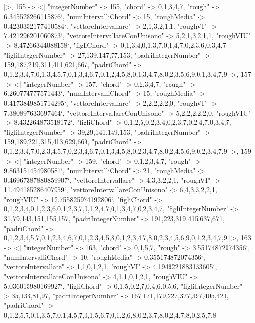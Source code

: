 \documentclass[
]{article}
\begin{document}
\begin{DatasetVerbatim}
  |>,
  155 -> <|
    "integerNumber" -> 155,
    "chord" -> {0,1,3,4,7},
    "rough" -> 6.345528266115876`,
    "numIntervalliChord" -> 15,
    "roughMedia" -> 0.4230352177410584`,
    "vettoreIntervallare" -> {2,1,3,2,1,1},
    "roughVI" -> 7.421296201060873`,
    "vettoreIntervallareConUnisono" -> {5,2,1,3,2,1,1},
    "roughVIU" -> 8.47266344088158`,
    "figliChord" -> {{0,1,3,4},{0,1,3,7},{0,1,4,7},{0,2,3,6},{0,3,4,7}},
    "figliIntegerNumber" -> {27,139,147,77,153},
    "padriIntegerNumber" -> {159,187,219,311,411,621,667},
    "padriChord" -> {{0,1,2,3,4,7},{0,1,3,4,5,7},{0,1,3,4,6,7},{0,1,2,4,5,8},{0,1,3,4,7,8},{0,2,3,5,6,9},{0,1,3,4,7,9}}
  |>,
  157 -> <|
    "integerNumber" -> 157,
    "chord" -> {0,2,3,4,7},
    "rough" -> 6.260774777571443`,
    "numIntervalliChord" -> 15,
    "roughMedia" -> 0.4173849851714295`,
    "vettoreIntervallare" -> {2,2,2,2,2,0},
    "roughVI" -> 7.380897633697464`,
    "vettoreIntervallareConUnisono" -> {5,2,2,2,2,2,0},
    "roughVIU" -> 8.432264873518172`,
    "figliChord" -> {{0,1,2,5},{0,2,3,4},{0,2,3,7},{0,2,4,7},{0,3,4,7}},
    "figliIntegerNumber" -> {39,29,141,149,153},
    "padriIntegerNumber" -> {159,189,221,315,413,629,669},
    "padriChord" -> {{0,1,2,3,4,7},{0,2,3,4,5,7},{0,2,3,4,6,7},{0,1,3,4,5,8},{0,2,3,4,7,8},{0,2,4,5,6,9},{0,2,3,4,7,9}}
  |>,
  159 -> <|
    "integerNumber" -> 159,
    "chord" -> {0,1,2,3,4,7},
    "rough" -> 9.863151454980581`,
    "numIntervalliChord" -> 21,
    "roughMedia" -> 0.46967387880859907`,
    "vettoreIntervallare" -> {4,3,3,2,2,1},
    "roughVI" -> 11.494185286407959`,
    "vettoreIntervallareConUnisono" -> {6,4,3,3,2,2,1},
    "roughVIU" -> 12.755825974192806`,
    "figliChord" -> {{0,1,2,3,4},{0,1,2,3,6},{0,1,2,3,7},{0,1,2,4,7},{0,1,3,4,7},{0,2,3,4,7}},
    "figliIntegerNumber" -> {31,79,143,151,155,157},
    "padriIntegerNumber" -> {191,223,319,415,637,671},
    "padriChord" -> {{0,1,2,3,4,5,7},{0,1,2,3,4,6,7},{0,1,2,3,4,5,8},{0,1,2,3,4,7,8},{0,2,3,4,5,6,9},{0,1,2,3,4,7,9}}
  |>,
  163 -> <|
    "integerNumber" -> 163,
    "chord" -> {0,1,5,7},
    "rough" -> 3.55174872074356`,
    "numIntervalliChord" -> 10,
    "roughMedia" -> 0.355174872074356`,
    "vettoreIntervallare" -> {1,1,0,1,2,1},
    "roughVI" -> 4.1949221883133605`,
    "vettoreIntervallareConUnisono" -> {4,1,1,0,1,2,1},
    "roughVIU" -> 5.036015980169927`,
    "figliChord" -> {{0,1,5},{0,2,7},{0,4,6},{0,5,6}},
    "figliIntegerNumber" -> {35,133,81,97},
    "padriIntegerNumber" -> {167,171,179,227,327,397,405,421},
    "padriChord" -> {{0,1,2,5,7},{0,1,3,5,7},{0,1,4,5,7},{0,1,5,6,7},{0,1,2,6,8},{0,2,3,7,8},{0,2,4,7,8},{0,2,5,7,8}}

\end{DatasetVerbatim}
\end{document}
